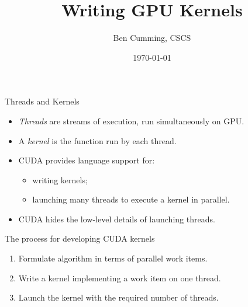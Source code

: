 \documentclass[aspectratio=43]{beamer}
\author{Ben Cumming, CSCS}
\title{Writing GPU Kernels}
\subtitle{}
\date{\today}
\begin{document}
\cscstitle


\begin{frame}[fragile]{Threads and Kernels}
    \begin{itemize}
        \item \emph{Threads} are streams of execution, run simultaneously on GPU.
        \item A \emph{kernel} is the function run by each thread.
        \item CUDA provides language support for:
        \begin{itemize}
            \item writing kernels;
            \item launching many threads to execute a kernel in parallel.
        \end{itemize}
        \item CUDA hides the low-level details of launching threads.
    \end{itemize}

    \begin{info}{The process for developing CUDA kernels}
        \begin{enumerate}
            \item Formulate algorithm in terms of parallel work items.
            \item Write a kernel implementing a work item on one thread.
            \item Launch the kernel with the required number of threads.
        \end{enumerate}
    \end{info}
\end{frame}
\end{document}
